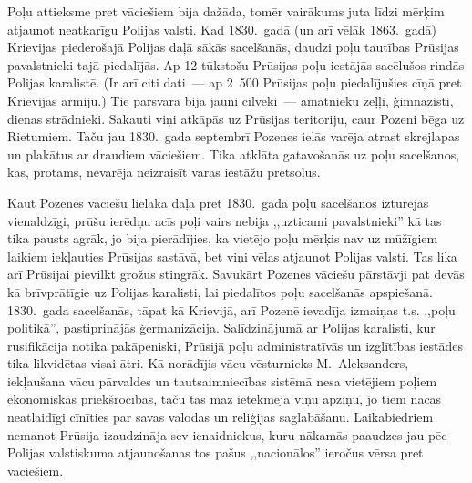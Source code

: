 \documentclass[twoside,a5paper,12pt,fleqn,openany]{extbook}
\begin{document}
Poļu attieksme pret vāciešiem bija dažāda, tomēr vairākums juta līdzi mērķim atjaunot neatkarīgu Polijas valsti. Kad 1830.~gadā (un arī vēlāk 1863.~gadā) Krievijas piederošajā Polijas daļā sākās sacelšanās, daudzi poļu tautības Prūsijas pavalstnieki tajā piedalījās. Ap 12 tūkstošu Prūsijas poļu iestājās sacēlušos rindās Polijas karalistē. (Ir arī citi dati~--- ap 2~500 Prūsijas poļu piedalījušies cīņā pret Krievijas armiju.) Tie pārsvarā bija jauni cilvēki~--- amatnieku zeļļi, ģimnāzisti, dienas strādnieki. Sakauti viņi atkāpās uz Prūsijas teritoriju, caur Pozeni bēga uz Rietumiem. Taču jau 1830.~gada septembrī Pozenes ielās varēja atrast skrejlapas un plakātus ar draudiem vāciešiem. Tika atklāta gatavošanās uz poļu sacelšanos, kas, protams, nevarēja neizraisīt varas iestāžu pretsoļus.

Kaut Pozenes vāciešu lielākā daļa pret 1830.~gada poļu sacelšanos izturējās vienaldzīgi, prūšu ierēdņu acīs poļi vairs nebija ,,uzticami pavalstnieki'' kā tas tika pausts agrāk, jo bija pierādījies, ka vietējo poļu mērķis nav uz mūžīgiem laikiem iekļauties Prūsijas sastāvā, bet viņi vēlas atjaunot Polijas valsti. Tas lika arī Prūsijai pievilkt grožus stingrāk. Savukārt Pozenes vāciešu pārstāvji pat devās kā brīvprātīgie uz Polijas karalisti, lai piedalītos poļu sacelšanās apspiešanā. 1830.~gada sacelšanās, tāpat kā Krievijā, arī Pozenē ievadīja izmaiņas t.s. ,,poļu politikā'', pastiprinājās ģermanizācija. Salīdzinājumā ar Polijas karalisti, kur rusifikācija notika pakāpeniski, Prūsijā poļu administratīvās un izglītības iestādes tika likvidētas visai ātri. Kā norādījis vācu vēsturnieks M.~Aleksanders, iekļaušana vācu pārvaldes un tautsaimniecības sistēmā nesa vietējiem poļiem ekonomiskas priekšrocības, taču tas maz ietekmēja viņu apziņu, jo tiem nācās neatlaidīgi cīnīties par savas valodas un reliģijas saglabāšanu. Laikabiedriem nemanot Prūsija izaudzināja sev ienaidniekus, kuru nākamās paaudzes jau pēc Polijas valstiskuma atjaunošanas tos pašus ,,nacionālos'' ieročus vērsa pret vāciešiem.
\end{document}
